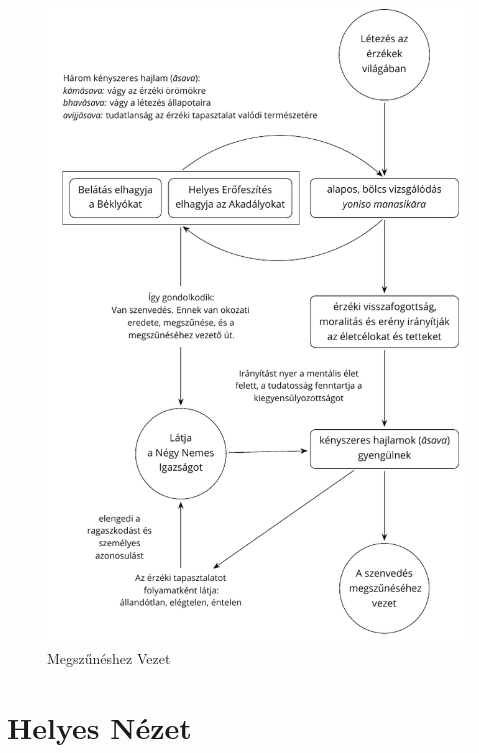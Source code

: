 \clearpage

\begin{figure}[h]
\vspace*{-10mm}%
\caption{Megszűnéshez Vezet}\label{fig-leading-to-cessation}

\centering

\includegraphics[width=\linewidth]{./manuscript/tex/diagrams/leading-to-cessation-hu.pdf}

\end{figure}

\clearpage
\normalpagelayout

\section{Helyes Nézet}

